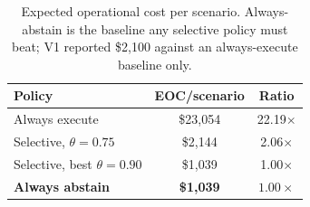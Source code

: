 \begin{table}[t]
\centering
\caption{Expected operational cost per scenario. Always-abstain is the baseline any selective policy must beat; V1 reported \$2{,}100 against an always-execute baseline only.}
\label{tab:eoc}
\footnotesize
\begin{tabular}{lcc}
\toprule
\textbf{Policy} & \textbf{EOC/scenario} & \textbf{Ratio} \\
\midrule
Always execute & \$23,054 & 22.19$\times$ \\
Selective, $\theta{=}0.75$ & \$2,144 & 2.06$\times$ \\
Selective, best $\theta{=}0.90$ & \$1,039 & 1.00$\times$ \\
\textbf{Always abstain} & \textbf{\$1,039} & $1.00\times$ \\
\bottomrule
\end{tabular}
\end{table}
